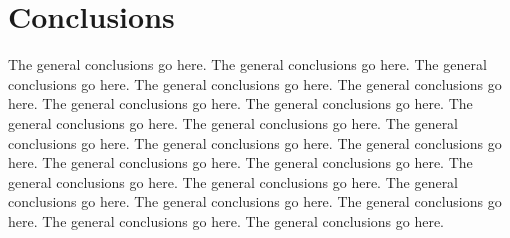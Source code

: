 \chapter{Conclusions}

The general conclusions go here.
The general conclusions go here.
The general conclusions go here.
The general conclusions go here.
The general conclusions go here.
The general conclusions go here.
The general conclusions go here.
The general conclusions go here.
The general conclusions go here.
The general conclusions go here.
The general conclusions go here.
The general conclusions go here.
The general conclusions go here.
The general conclusions go here.
The general conclusions go here.
The general conclusions go here.
The general conclusions go here.
The general conclusions go here.
The general conclusions go here.
The general conclusions go here.
The general conclusions go here.
